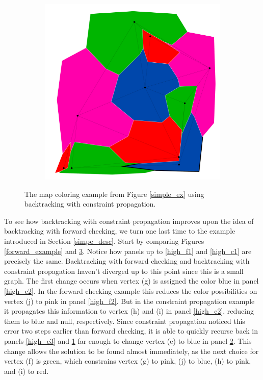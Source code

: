 \documentclass{article}
\begin{document}
\begin{figure}[h!]
\begin{subfigure}{0.18\textwidth}
				\caption{}
				\label{high_c4}
			\end{subfigure}
			\;
			\begin{subfigure}{0.18\textwidth}
				\centering
				\includegraphics[width=\textwidth]{images/sequences/mac_backtracking/bt_mac_I00018}
				\caption{}
				\label{high_c5}
			\end{subfigure}
	
			\caption{The map coloring example from Figure \ref{simple_ex} using backtracking with constraint propagation.}
			\label{mac_example}
		\end{figure}
		
		To see how backtracking with constraint propagation improves upon the idea of backtracking with forward checking, we turn one last time to the example introduced in Section \ref{simpe_desc}. Start by comparing Figures \ref{forward_example} and \ref{mac_example}. Notice how panels up to \ref{high_f1} and \ref{high_c1} are precisely the same. Backtracking with forward checking and backtracking with constraint propagation haven't diverged up to this point since this is a small graph. The first change occurs when vertex (g) is assigned the color blue in panel \ref{high_c2}. In the forward checking example this reduces the color possibilities on vertex (j) to pink in panel \ref{high_f2}. But in the constraint propagation example it propagates this information to vertex (h) and (i) in panel \ref{high_c2}, reducing them to blue and null, respectively. Since constraint propagation noticed this error two steps earlier than forward checking, it is able to quickly recurse back in panels \ref{high_c3} and \ref{high_c4} far enough to change vertex (e) to blue in panel \ref{high_c5}. This change allows the solution to be found almost immediately, as the next choice for vertex (f) is green, which constrains vertex (g) to pink, (j) to blue, (h) to pink, and (i) to red.
		
\end{document}
